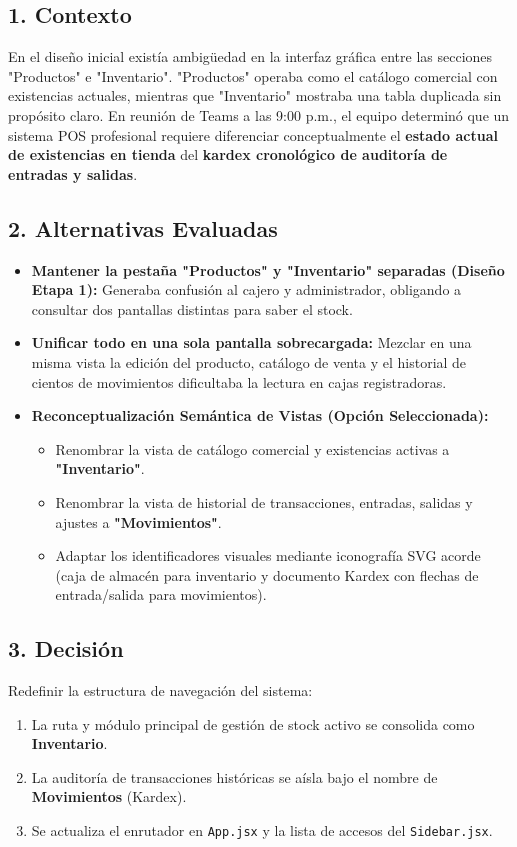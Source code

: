 \documentclass[11pt,a4paper]{article}
\begin{document}
\subsection{1. Contexto}
En el diseño inicial existía ambigüedad en la interfaz gráfica entre las secciones "Productos" e "Inventario". "Productos" operaba como el catálogo comercial con existencias actuales, mientras que "Inventario" mostraba una tabla duplicada sin propósito claro. En reunión de Teams a las 9:00 p.m., el equipo determinó que un sistema POS profesional requiere diferenciar conceptualmente el \textbf{estado actual de existencias en tienda} del \textbf{kardex cronológico de auditoría de entradas y salidas}.

\subsection{2. Alternativas Evaluadas}
\begin{itemize}[leftmargin=*]
    \item \textbf{Mantener la pestaña "Productos" y "Inventario" separadas (Diseño Etapa 1):} Generaba confusión al cajero y administrador, obligando a consultar dos pantallas distintas para saber el stock.
    \item \textbf{Unificar todo en una sola pantalla sobrecargada:} Mezclar en una misma vista la edición del producto, catálogo de venta y el historial de cientos de movimientos dificultaba la lectura en cajas registradoras.
    \item \textbf{Reconceptualización Semántica de Vistas (Opción Seleccionada):} 
    \begin{itemize}
        \item Renombrar la vista de catálogo comercial y existencias activas a \textbf{"Inventario"}.
        \item Renombrar la vista de historial de transacciones, entradas, salidas y ajustes a \textbf{"Movimientos"}.
        \item Adaptar los identificadores visuales mediante iconografía SVG acorde (caja de almacén para inventario y documento Kardex con flechas de entrada/salida para movimientos).
    \end{itemize}
\end{itemize}

\subsection{3. Decisión}
Redefinir la estructura de navegación del sistema:
\begin{enumerate}
    \item La ruta y módulo principal de gestión de stock activo se consolida como \textbf{Inventario}.
    \item La auditoría de transacciones históricas se aísla bajo el nombre de \textbf{Movimientos} (Kardex).
    \item Se actualiza el enrutador en \texttt{App.jsx} y la lista de accesos del \texttt{Sidebar.jsx}.
\end{enumerate}
\end{document}
